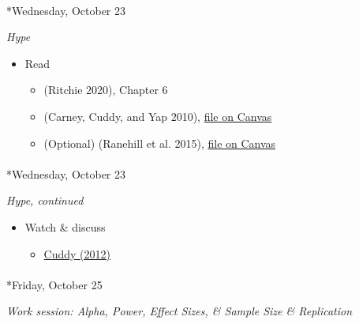 \documentclass[
  letterpaper,
  DIV=11,
  numbers=noendperiod]{scrartcl}
\makeatletter
\let\oldparagraph\paragraph
\renewcommand{\paragraph}{
    \@ifstar
      \xxxParagraphStar
      \xxxParagraphNoStar
  }
\newcommand{\xxxParagraphStar}[1]{\oldparagraph*{#1}\mbox{}}
\newcommand{\xxxParagraphNoStar}[1]{\oldparagraph{#1}\mbox{}}
\providecommand{\tightlist}{%
  \setlength{\itemsep}{0pt}\setlength{\parskip}{0pt}}\usepackage{longtable,booktabs,array}
\makeatother
\begin{document}
\paragraph*{Wednesday, October 23}\label{wednesday-october-23}

\emph{Hype}

\begin{itemize}
\tightlist
\item
  Read

  \begin{itemize}
  \tightlist
  \item
    (Ritchie 2020), Chapter 6
  \item
    (Carney, Cuddy, and Yap 2010),
    \href{https://psu.instructure.com/courses/2350148/files/folder/readings?preview=165170721}{file
    on Canvas}
  \item
    (Optional) (Ranehill et al. 2015),
    \href{https://psu.instructure.com/courses/2350148/files/folder/readings?preview=165170720}{file
    on Canvas}
  \end{itemize}
\end{itemize}

\paragraph*{Wednesday, October 23}\label{wednesday-october-23-1}

\emph{Hype, continued}

\begin{itemize}
\tightlist
\item
  Watch \& discuss

  \begin{itemize}
  \tightlist
  \item
    \href{https://www.ted.com/talks/amy_cuddy_your_body_language_may_shape_who_you_are}{Cuddy
    (2012)}
  \end{itemize}
\end{itemize}

\paragraph*{Friday, October 25}\label{friday-october-25}

\emph{Work session: Alpha, Power, Effect Sizes, \& Sample Size \&
Replication}
\end{document}

